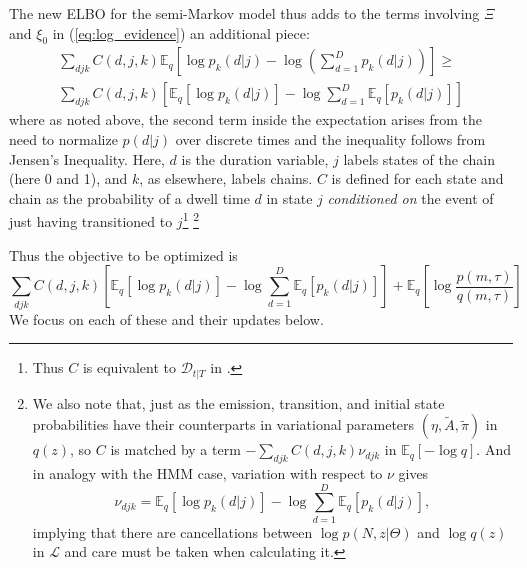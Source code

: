\documentclass[10pt,letterpaper]{article}
\begin{document}
The new ELBO for the semi-Markov model thus adds to the terms involving $\Xi$ and $\xi_0$ in (\ref{eq:log_evidence}) an additional piece:
\begin{multline}
    \sum_{d j k} C(d, j, k) \mathbb{E}_q \left[\log p_k(d|j) - \log \left(\sum_{d=1}^D p_k(d|j) \right) \right] \ge \\
    \sum_{d j k} C(d, j, k) \left[\mathbb{E}_q \left[\log p_k(d|j)\right] - \log \sum_{d=1}^D \mathbb{E}_q\left[p_k(d|j) \right] \right]
\end{multline}
where as noted above, the second term inside the expectation arises from the need to normalize $p(d|j)$ over discrete times and the inequality follows from Jensen's Inequality. Here, $d$ is the duration variable, $j$ labels states of the chain (here 0 and 1), and $k$, as elsewhere, labels chains\cite{Mitchell1993-sl,Mitchell1995-go,Yu2006-bb}. $C$ is defined for each state and chain as the probability of a dwell time $d$ in state $j$ \emph{conditioned on} the event of just having transitioned to $j$\footnote{Thus $C$ is equivalent to $\mathcal{D}_{t|T}$ in \cite{Yu2006-bb}.}
\footnote{
We also note that, just as the emission, transition, and initial state probabilities have their counterparts in variational parameters $(\eta, \tilde{A}, \tilde{\pi})$ in $q(z)$, so $C$ is matched by a term $-\sum_{djk} C(d, j, k) \nu_{djk}$ in $\mathbb{E}_q[-\log q]$. And in analogy with the HMM case, variation with respect to $\nu$ gives
\begin{equation}
    \nu_{djk} = \mathbb{E}_q \left[\log p_k(d|j)\right] - \log \sum_{d=1}^D \mathbb{E}_q\left[p_k(d|j) \right],
\end{equation}
implying that there are cancellations between $\log p(N, z|\Theta)$ and $\log q(z)$ in $\mathcal{L}$ and care must be taken when calculating it\cite{beal2003variational}.}

Thus the objective to be optimized is
\begin{equation}
    \label{semi_markov_opt}
    \sum_{d j k} C(d, j, k) \left[\mathbb{E}_q \left[\log p_k(d|j)\right] - \log \sum_{d=1}^D \mathbb{E}_q\left[p_k(d|j) \right] \right] + \mathbb{E}_q\left[\log \frac{p(m, \tau)}{q(m, \tau)} \right]
\end{equation}
We focus on each of these and their updates below.
\end{document}
